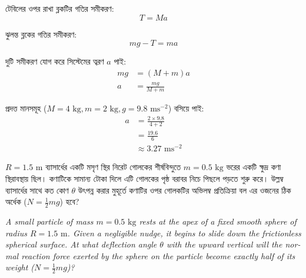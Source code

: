 \documentclass[12pt, a4paper]{article}
\begin{document}
\begin{tcolorbox}[solutionbox={সমাধান (Solution)}]
    \noindent
    টেবিলের ওপর রাখা ব্লকটির গতির সমীকরণ:
    \[ T = M a \]
    
    ঝুলন্ত ব্লকের গতির সমীকরণ:
    \[ m g - T = m a \]
    
    দুটি সমীকরণ যোগ করে সিস্টেমের ত্বরণ $a$ পাই:
    \begin{align*}
        m g &= (M + m) a \\
        a &= \frac{m g}{M + m}
    \end{align*}
    
    প্রদত্ত মানসমূহ ($M = 4\text{ kg}, m = 2\text{ kg}, g = 9.8\text{ ms}^{-2}$) বসিয়ে পাই:
    \begin{align*}
        a &= \frac{2 \times 9.8}{4 + 2} \\
          &= \frac{19.6}{6} \\
          &\approx \mathbf{3.27}\text{ ms}^{-2}
    \end{align*}
\end{tcolorbox}
\begin{tcolorbox}[questionbox={প্রশ্ন (Question) 13}]
    \noindent
    $R = 1.5\text{ m}$ ব্যাসার্ধের একটি মসৃণ স্থির নিরেট গোলকের শীর্ষবিন্দুতে $m = 0.5\text{ kg}$ ভরের একটি ক্ষুদ্র কণা স্থিরাবস্থায় ছিল। কণাটিকে সামান্য টোকা দিলে এটি গোলকের পৃষ্ঠ বরাবর নিচে পিছলে পড়তে শুরু করে। উল্লম্ব ব্যাসার্ধের সাথে কত কোণ $\theta$ উৎপন্ন করার মুহূর্তে কণাটির ওপর গোলকটির অভিলম্ব প্রতিক্রিয়া বল এর ওজনের ঠিক অর্ধেক ($N = \frac{1}{2} mg$) হবে?
    
    \vspace{0.8em}
    \begin{english}
    \noindent\textit{\color{darkgray}
    A small particle of mass $m = 0.5\text{ kg}$ rests at the apex of a fixed smooth sphere of radius $R = 1.5\text{ m}$. Given a negligible nudge, it begins to slide down the frictionless spherical surface. At what deflection angle $\theta$ with the upward vertical will the normal reaction force exerted by the sphere on the particle become exactly half of its weight ($N = \frac{1}{2} mg$)?
    }
    \end{english}
\end{tcolorbox}
\end{document}
